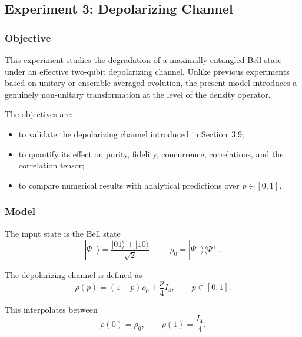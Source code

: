 \documentclass[a4paper]{article}
\begin{document}
\newpage

\subsection{Experiment 3: Depolarizing Channel}


\subsubsection{Objective}

This experiment studies the degradation of a maximally entangled Bell state under an effective two-qubit depolarizing channel. Unlike previous experiments based on unitary or ensemble-averaged evolution, the present model introduces a genuinely non-unitary transformation at the level of the density operator.

The objectives are:
\begin{itemize}
\item to validate the depolarizing channel introduced in Section~3.9;
\item to quantify its effect on purity, fidelity, concurrence, correlations, and the correlation tensor;
\item to compare numerical results with analytical predictions over \(p \in [0,1]\).
\end{itemize}


\subsubsection{Model}

The input state is the Bell state
\[
|\Psi^+\rangle = \frac{|01\rangle + |10\rangle}{\sqrt{2}},
\qquad
\rho_0 = |\Psi^+\rangle\langle\Psi^+|.
\]

The depolarizing channel is defined as
\[
\rho(p) = (1-p)\rho_0 + \frac{p}{4}I_4,
\qquad p \in [0,1].
\]

This interpolates between
\[
\rho(0)=\rho_0,
\qquad
\rho(1)=\frac{I_4}{4}.
\]

\end{document}
